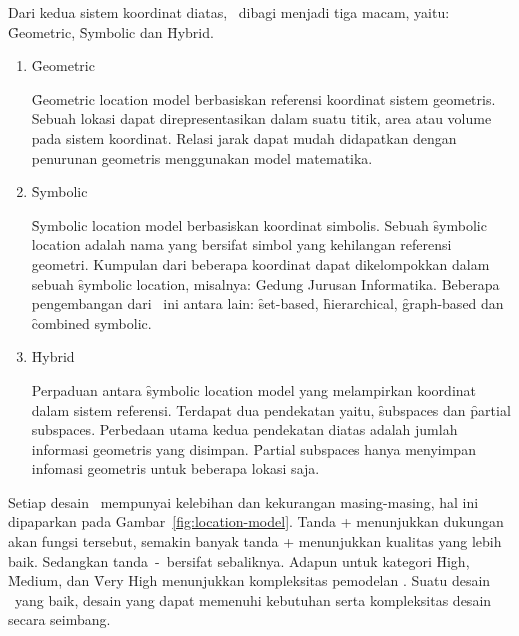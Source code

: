 Dari kedua sistem koordinat diatas, \locationmodel~dibagi menjadi tiga macam, yaitu:
\f{Geometric}, \f{Symbolic} dan \f{Hybrid}.

\begin{enumerate}[noitemsep,nolistsep,leftmargin=0cm,itemindent=.5cm,listparindent=\parindent]
    \item \f{Geometric}

\f{Geometric location model} berbasiskan referensi koordinat sistem geometris.
Sebuah lokasi dapat direpresentasikan dalam suatu titik, area atau volume pada
sistem koordinat.  Relasi jarak dapat mudah didapatkan dengan penurunan
geometris menggunakan model matematika.

    \item \f{Symbolic}

\f{Symbolic location model} berbasiskan koordinat simbolis. Sebuah \f{symbolic
location} adalah nama yang bersifat simbol yang kehilangan referensi geometri.
Kumpulan dari beberapa koordinat dapat dikelompokkan dalam sebuah \f{symbolic
location}, misalnya: Gedung Jurusan Informatika. Beberapa pengembangan dari
\locationmodel~ini antara lain: \f{set-based}, \f{hierarchical},
\f{graph-based} dan \f{combined symbolic}.

    \item \f{Hybrid}

Perpaduan antara \f{symbolic location model} yang melampirkan koordinat dalam
sistem referensi. Terdapat dua pendekatan yaitu, \f{subspaces} dan \f{partial
subspaces}.  Perbedaan utama kedua pendekatan diatas adalah jumlah informasi
geometris yang disimpan.  \f{Partial subspaces} hanya menyimpan infomasi
geometris untuk beberapa lokasi saja.

\end{enumerate}

Setiap desain \locationmodel~mempunyai kelebihan dan kekurangan masing-masing,
hal ini dipaparkan pada Gambar~\ref{fig:location-model}. Tanda + menunjukkan
dukungan akan fungsi tersebut, semakin banyak tanda + menunjukkan kualitas yang
lebih baik.  Sedangkan tanda~-~bersifat sebaliknya. Adapun untuk kategori
\f{High}, \f{Medium}, dan \f{Very High} menunjukkan kompleksitas pemodelan
\locationmodel. Suatu desain \locationmodel~yang baik, desain yang dapat
memenuhi kebutuhan serta kompleksitas desain secara seimbang.

